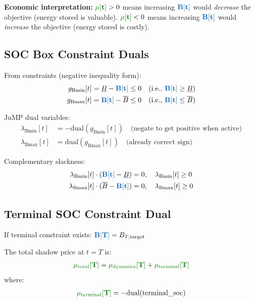 \documentclass[11pt]{article}
\newcommand{\blueB}[1]{\textcolor{bluevar}{\mathbf{#1}}}      %
\newcommand{\greenmu}[1]{\textcolor{greenvar}{\mathbf{#1}}}   %
\begin{document}
\textbf{Economic interpretation:} $\greenmu{\mu[t]} > 0$ means increasing $\blueB{B[t]}$ would \textit{decrease} the objective (energy stored is valuable). $\greenmu{\mu[t]} < 0$ means increasing $\blueB{B[t]}$ would \textit{increase} the objective (energy stored is costly).

\subsection{SOC Box Constraint Duals}
From constraints (negative inequality form):
\begin{align}
g_{\text{Bmin}}[t] &= \underline{B} - \blueB{B[t]} \leq 0 \quad \text{(i.e., } \blueB{B[t]} \geq \underline{B}\text{)} \\
g_{\text{Bmax}}[t] &= \blueB{B[t]} - \overline{B} \leq 0 \quad \text{(i.e., } \blueB{B[t]} \leq \overline{B}\text{)}
\end{align}

JuMP dual variables:
\begin{align}
\lambda_{\text{Bmin}}[t] &= -\text{dual}(g_{\text{Bmin}}[t]) \quad \text{(negate to get positive when active)} \\
\lambda_{\text{Bmax}}[t] &= \text{dual}(g_{\text{Bmax}}[t]) \quad \text{(already correct sign)}
\end{align}

Complementary slackness:
\begin{align}
\lambda_{\text{Bmin}}[t] \cdot (\blueB{B[t]} - \underline{B}) &= 0, \quad \lambda_{\text{Bmin}}[t] \geq 0 \\
\lambda_{\text{Bmax}}[t] \cdot (\overline{B} - \blueB{B[t]}) &= 0, \quad \lambda_{\text{Bmax}}[t] \geq 0
\end{align}

\subsection{Terminal SOC Constraint Dual}
If terminal constraint exists: $\blueB{B[T]} = B_{T,\text{target}}$

The total shadow price at $t = T$ is:
\begin{align}
\greenmu{\mu_{\text{total}}[T]} = \greenmu{\mu_{\text{dynamics}}[T]} + \greenmu{\mu_{\text{terminal}}[T]}
\end{align}
where:
\begin{align}
\greenmu{\mu_{\text{terminal}}[T]} = -\text{dual}(\text{terminal\_soc})
\end{align}
\end{document}
